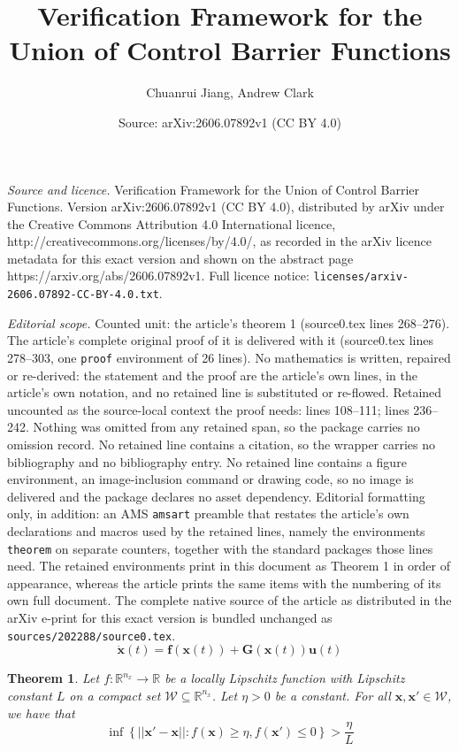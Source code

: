 \documentclass[10pt,a4paper]{amsart}
\title{Verification Framework for the Union of Control Barrier Functions}
\author{Chuanrui Jiang, Andrew Clark}
\date{Source: arXiv:2606.07892v1 (CC BY 4.0)}
\newtheorem{theorem}{Theorem}
\begin{document}
\maketitle

\noindent\emph{Source and licence.} Verification Framework for the Union of Control Barrier Functions. Version arXiv:2606.07892v1 (CC BY 4.0), distributed by arXiv under the Creative Commons Attribution 4.0 International licence, http://creativecommons.org/licenses/by/4.0/, as recorded in the arXiv licence metadata for this exact version and shown on the abstract page https://arxiv.org/abs/2606.07892v1. Full licence notice: \texttt{licenses/arxiv-2606.07892-CC-BY-4.0.txt}.\par\smallskip

\noindent\textit{Editorial scope.} Counted unit: the article's theorem 1 (source0.tex lines 268--276). The article's complete original proof of it is delivered with it (source0.tex lines 278--303, one \texttt{proof} environment of 26 lines). No mathematics is written, repaired or re-derived: the statement and the proof are the article's own lines, in the article's own notation, and no retained line is substituted or re-flowed.  Retained uncounted as the source-local context the proof needs: lines 108--111; lines 236--242.  Nothing was omitted from any retained span, so the package carries no omission record.  No retained line contains a citation, so the wrapper carries no bibliography and no bibliography entry.  No retained line contains a figure environment, an image-inclusion command or drawing code, so no image is delivered and the package declares no asset dependency.  Editorial formatting only, in addition: an AMS \texttt{amsart} preamble that restates the article's own declarations and macros used by the retained lines, namely the environments \texttt{theorem} on separate counters, together with the standard packages those lines need.  The retained environments print in this document as Theorem 1 in order of appearance, whereas the article prints the same items with the numbering of its own full document.  The complete native source of the article as distributed in the arXiv e-print for this exact version is bundled unchanged as \texttt{sources/202288/source0.tex}.
\begin{equation}
\label{eq:sys_dyn_control_aff}
    \Dot{\mathbf{x}}(t) = \mathbf{f}(\mathbf{x}(t)) + \mathbf{G}(\mathbf{x}(t))\mathbf{u}(t)
\end{equation}

\begin{theorem}
\label{thm:positive_switching_dist}
     Let $f: \mathbb{R}^{n_x}\rightarrow\mathbb{R}$ be a locally Lipschitz function with Lipschitz constant $L$ on a compact set $\mathcal{W}\subseteq\mathbb{R}^{n_x}$. Let $\eta > 0$ be a constant. For all $\mathbf{x}, \mathbf{x}'\in\mathcal{W}$, we have that 
     \begin{equation*}
         \inf \left\{ ||\mathbf{x}'-\mathbf{x}|| : f(\mathbf{x})\geq \eta, f(\mathbf{x}')\leq 0 \right\} > \frac{\eta}{L}
     \end{equation*}
\end{theorem}
\end{document}

